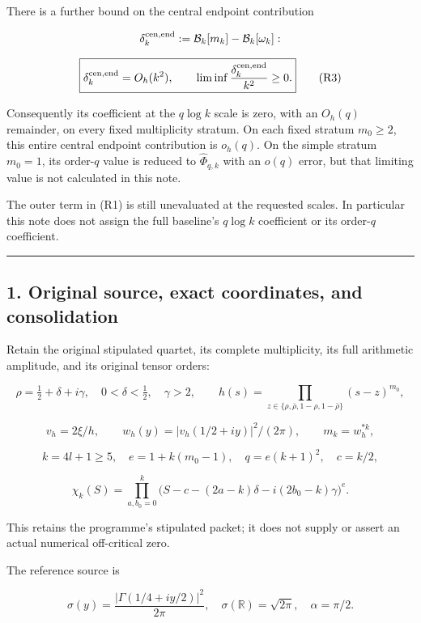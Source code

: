 There is a further bound on the central endpoint contribution

\[
\delta_k^{\rm cen,end}:=\mathcal B_k[m_k]-\mathcal B_k[\omega_k]:
\]

\[
\boxed{\delta_k^{\rm cen,end}=O_h(k^2),\qquad
\liminf\frac{\delta_k^{\rm cen,end}}{k^2}\ge0.}
\tag{R3}
\]

Consequently its coefficient at the \(q\log k\) scale is zero, with an \(O_h(q)\) remainder, on every fixed multiplicity stratum. On each fixed stratum \(m_0\ge2\), this entire central endpoint contribution is \(o_h(q)\). On the simple stratum \(m_0=1\), its order-\(q\) value is reduced to \(\widehat\Phi_{q,k}\) with an \(o(q)\) error, but that limiting value is not calculated in this note.

The outer term in (R1) is still unevaluated at the requested scales. In particular this note does not assign the full baseline's \(q\log k\) coefficient or its order-\(q\) coefficient.

\begin{center}\rule{0.5\linewidth}{0.5pt}\end{center}

\subsection{1. Original source, exact coordinates, and consolidation}\label{original-source-exact-coordinates-and-consolidation}

Retain the original stipulated quartet, its complete multiplicity, its full arithmetic amplitude, and its original tensor orders:

\[
\rho=\tfrac12+\delta+i\gamma,\quad 0<\delta<\tfrac12,\quad\gamma>2,
\qquad h(s)=\prod_{z\in\{\rho,\bar\rho,1-\rho,1-\bar\rho\}}(s-z)^{m_0},
\]

\[
v_h=2\xi/h,\qquad w_h(y)=|v_h(1/2+iy)|^2/(2\pi),\qquad m_k=w_h^{*k},
\]

\[
k=4l+1\ge5,\quad e=1+k(m_0-1),\quad q=e(k+1)^2,\quad c=k/2,
\]

\[
\chi_k(S)=\prod_{a,b_0=0}^k
\bigl(S-c-(2a-k)\delta-i(2b_0-k)\gamma\bigr)^e.
\]

This retains the programme's stipulated packet; it does not supply or assert an actual numerical off-critical zero.

The reference source is

\[
\sigma(y)=\frac{|\Gamma(1/4+iy/2)|^2}{2\pi},\quad
\sigma(\mathbb R)=\sqrt{2\pi},\quad\alpha=\pi/2.
\]

